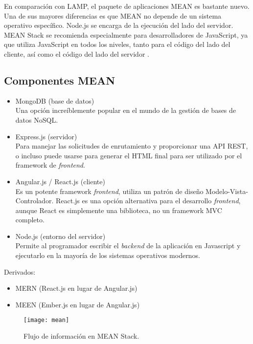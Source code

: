En comparación con LAMP, el paquete de aplicaciones MEAN es bastante nuevo. Una de sus mayores diferencias es que MEAN no depende de un sistema operativo específico. Node.js se encarga de la ejecución del lado del servidor. MEAN Stack se recomienda especialmente para desarrolladores de JavaScript, ya que utiliza JavaScript en todos los niveles, tanto para el código del lado del cliente, así como el código del lado del servidor \cite{srinivasan}.
\vspace{0.8cm}

\subsection{Componentes MEAN}
\begin{itemize}
  \item MongoDB (base de datos)\\
  Una opción increíblemente popular en el mundo de la gestión de bases de datos NoSQL.
  \item Express.js (servidor)\\
  Para manejar las solicitudes de enrutamiento y proporcionar una API REST, o incluso puede usarse para generar el HTML final para ser utilizado por el framework de \textit{frontend}.
  \item Angular.js / React.js (cliente)\\
  Es un potente framework \textit{frontend}, utiliza un patrón de diseño Modelo-Vista-Controlador. React.js es una opción alternativa para el desarrollo \textit{frontend}, aunque React es simplemente una biblioteca, no un framework MVC completo.
  \item Node.js (entorno del servidor)\\
  Permite al programador escribir el \textit{backend} de la aplicación en Javascript y ejecutarlo en la mayoría de los sistemas operativos modernos.
\end{itemize}

Derivados:

\begin{itemize}
  \item MERN (React.js en lugar de Angular.js)
  \item MEEN (Ember.js en lugar de Angular.js)
\end{itemize} 

\begin{figure}[H]
  \centering
  \texttt{[image: mean]}
  \caption{Flujo de información en MEAN Stack.}
\end{figure}

